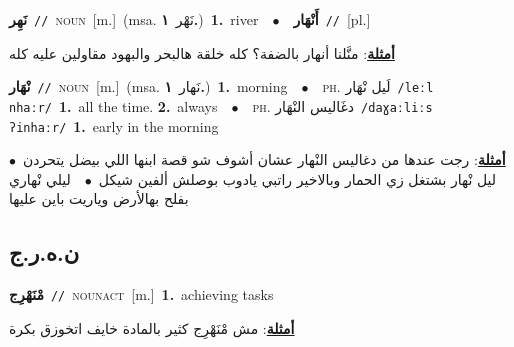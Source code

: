 \documentclass[10pt,a4paper,twoside]{article} %
\begin{document}
\begin{multicols}{2}
{\setlength\topsep{0pt}\textbf{\foreignlanguage{arabic}{نَهِر}}\ {\color{gray}\texttt{//}\color{black}}\ \textsc{noun}\ [m.]\ \color{gray}(msa. \foreignlanguage{arabic}{نَهْر}~\foreignlanguage{arabic}{\textbf{١.}})\color{black}\ \textbf{1.}~river\ \ $\bullet$\ \ \setlength\topsep{0pt}\textbf{\foreignlanguage{arabic}{أَنْهَار}}\ {\color{gray}\texttt{//}\color{black}}\ [pl.]\  \begin{flushright}\color{gray}\foreignlanguage{arabic}{\textbf{\underline{\foreignlanguage{arabic}{أمثلة}}}: منَّلنا أنهار بالضفة؟ كله خلقة هالبحر والبهود مقاولين عليه كله}\end{flushright}\color{black}} \vspace{2mm}

{\setlength\topsep{0pt}\textbf{\foreignlanguage{arabic}{نْهَار}}\ {\color{gray}\texttt{//}\color{black}}\ \textsc{noun}\ [m.]\ \color{gray}(msa. \foreignlanguage{arabic}{نَهار}~\foreignlanguage{arabic}{\textbf{١.}})\color{black}\ \textbf{1.}~morning\ \ $\bullet$\ \ \textsc{ph.} \color{gray} \foreignlanguage{arabic}{لَيل نْهَار}\color{black}\ {\color{gray}\texttt{/{\sffamily leːl nhaːr}/}\color{black}}\ \textbf{1.}~all the time.  \textbf{2.}~always\ \ $\bullet$\ \ \textsc{ph.} \color{gray} \foreignlanguage{arabic}{دغَاليس النْهَار}\color{black}\ {\color{gray}\texttt{/{\sffamily daɣaːliːs ʔinhaːr}/}\color{black}}\ \textbf{1.}~early in the morning\  \begin{flushright}\color{gray}\foreignlanguage{arabic}{\textbf{\underline{\foreignlanguage{arabic}{أمثلة}}}: رجت عندها من دغاليس النْهار عشان أشوف شو قصة ابنها اللي بيضل يتحردن\ $\bullet$\ \  ليل نْهار بشتغل زي الحمار وبالاخير راتبي يادوب بوصلش ألفين شيكل\ $\bullet$\ \  ليلي نْهاري بفلح بهالأرض وياريت باين عليها}\end{flushright}\color{black}} \vspace{2mm}

\vspace{-3mm}
\subsection*{\color{blue}\foreignlanguage{arabic}{ن.ه.ر.ج}\color{blue}{}} 

{\setlength\topsep{0pt}\textbf{\foreignlanguage{arabic}{مْنَهْرِج}}\ {\color{gray}\texttt{//}\color{black}}\ \textsc{noun\textunderscore act}\ [m.]\ \textbf{1.}~achieving tasks\  \begin{flushright}\color{gray}\foreignlanguage{arabic}{\textbf{\underline{\foreignlanguage{arabic}{أمثلة}}}: مش مْنَهْرِج كثير بالمادة خايف اتخوزق بكرة}\end{flushright}\color{black}} \vspace{2mm}


\end{multicols}
\end{document}
